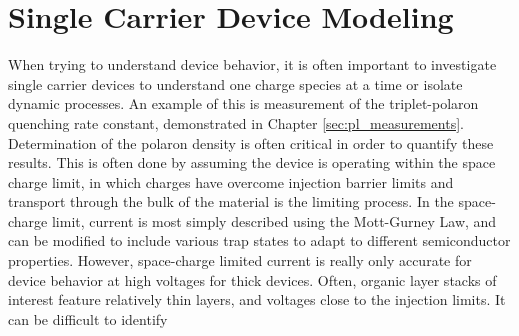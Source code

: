 \documentclass[../thesis.tex]{subfiles}
\begin{document}
\chapter{Single Carrier Device Modeling}\label{sec:polaron_density_measurement}

When trying to understand device behavior, it is often important to investigate single carrier devices to understand one charge species at a time or isolate dynamic processes.
An example of this is measurement of the triplet-polaron quenching rate constant, demonstrated in Chapter \ref{sec:pl_measurements}.
Determination of the polaron density is often critical in order to quantify these results.
This is often done by assuming the device is operating within the space charge limit, in which charges have overcome injection barrier limits and transport through the bulk of the material is the limiting process.\cite{Reineke2007,Erickson2014}
In the space-charge limit, current is most simply described using the Mott-Gurney Law, and can be modified to include various trap states to adapt to different semiconductor properties.\cite{Pope1999}
However, space-charge limited current is really only accurate for device behavior at high voltages for thick devices.  
Often, organic layer stacks of interest feature relatively thin layers, and voltages close to the injection limits.
It can be difficult to identify




\end{document}

